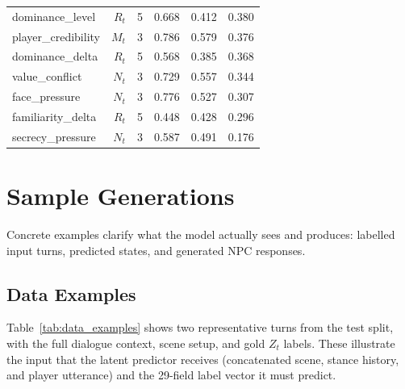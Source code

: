 \documentclass[11pt]{article}
\begin{document}
\begin{table}[tp]
\begin{tabular}{@{}lrrrrr@{}}
dominance\_level  & $R_t$ & 5  & 0.668 & 0.412 & 0.380 \\
player\_credibility & $M_t$ & 3 & 0.786 & 0.579 & 0.376 \\
dominance\_delta  & $R_t$ & 5  & 0.568 & 0.385 & 0.368 \\
value\_conflict   & $N_t$ & 3  & 0.729 & 0.557 & 0.344 \\
face\_pressure    & $N_t$ & 3  & 0.776 & 0.527 & 0.307 \\
familiarity\_delta& $R_t$ & 5  & 0.448 & 0.428 & 0.296 \\
secrecy\_pressure & $N_t$ & 3  & 0.587 & 0.491 & 0.176 \\
\bottomrule
\end{tabular}
\end{table}

\section{Sample Generations}
\label{app:samples}

Concrete examples clarify what the model actually sees and produces: labelled input turns, predicted states, and generated NPC responses.

\subsection{Data Examples}
\label{app:data_examples}

Table~\ref{tab:data_examples} shows two representative turns from the test split, with the full dialogue context, scene setup, and gold $Z_t$ labels.
These illustrate the input that the latent predictor receives (concatenated scene, stance history, and player utterance) and the 29-field label vector it must predict.
\end{document}
